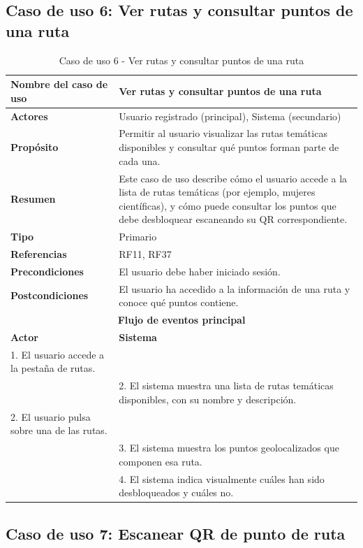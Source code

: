 \subsection{Caso de uso 6: Ver rutas y consultar puntos de una ruta}

\begin{table}[H]
\centering
\caption{Caso de uso 6 - Ver rutas y consultar puntos de una ruta}
\begin{tabular}{|p{4.5cm}|p{10.5cm}|}
\hline
\textbf{Nombre del caso de uso} & Ver rutas y consultar puntos de una ruta \\
\hline
\textbf{Actores} & Usuario registrado (principal), Sistema (secundario) \\
\hline
\textbf{Propósito} & Permitir al usuario visualizar las rutas temáticas disponibles y consultar qué puntos forman parte de cada una. \\
\hline
\textbf{Resumen} & Este caso de uso describe cómo el usuario accede a la lista de rutas temáticas (por ejemplo, mujeres científicas), y cómo puede consultar los puntos que debe desbloquear escaneando su QR correspondiente. \\
\hline
\textbf{Tipo} & Primario \\
\hline
\textbf{Referencias} & RF11, RF37 \\
\hline
\textbf{Precondiciones} & El usuario debe haber iniciado sesión. \\
\hline
\textbf{Postcondiciones} & El usuario ha accedido a la información de una ruta y conoce qué puntos contiene. \\
\hline
\multicolumn{2}{|c|}{\textbf{Flujo de eventos principal}} \\
\hline
\textbf{Actor} & \textbf{Sistema} \\
\hline
1. El usuario accede a la pestaña de rutas. & \\
\hline
& 2. El sistema muestra una lista de rutas temáticas disponibles, con su nombre y descripción. \\
\hline
2. El usuario pulsa sobre una de las rutas. & \\
\hline
& 3. El sistema muestra los puntos geolocalizados que componen esa ruta. \\
\hline
& 4. El sistema indica visualmente cuáles han sido desbloqueados y cuáles no. \\
\hline
\end{tabular}
\end{table}

\subsection{Caso de uso 7: Escanear QR de punto de ruta}

